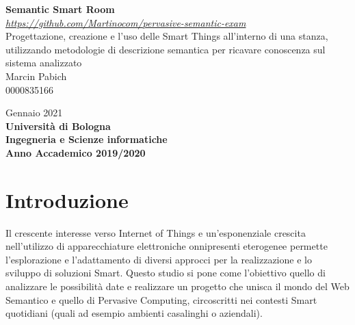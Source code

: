 \documentclass[12pt,a4paper,openright,oneside]{report}
\begin{document}
\begin{titlepage}
	\begin{center}
		
		\vspace*{40mm}
		{\Large{\textbf{Semantic Smart Room}}}\\
		
		\vspace*{4mm}
		{\small{\textit{\url{https://github.com/Martinocom/pervasive-semantic-exam}}}}\\
		
		\vspace*{4mm}
		{\Large{Progettazione, creazione e l'uso delle Smart Things all'interno di una stanza, utilizzando metodologie di descrizione semantica per ricavare conoscenza sul sistema analizzato}}\\
		
		\vspace{10mm}
		{\Large{Marcin Pabich\\}}
		{\large{0000835166}}
		
		\vspace{10mm}
		{\large{Gennaio 2021}}\\
		
		\vspace{20mm}
		{\large{\bf Università di Bologna}}\\
		\vspace{1mm}
		{\large{\bf Ingegneria e Scienze informatiche}}\\
		\vspace{1mm}
		{\large{\bf Anno Accademico 2019/2020}}
		\vspace*{\fill}
	\end{center}
\end{titlepage}
\tableofcontents                        %
\clearpage{\pagestyle{empty}\cleardoublepage}
\listoffigures                          %
\clearpage{\pagestyle{empty}\cleardoublepage}
\lstlistoflistings						%

\clearpage{\pagestyle{empty}\cleardoublepage}
\chapter{Introduzione}
Il crescente interesse verso Internet of Things e un'esponenziale crescita nell'utilizzo di apparecchiature elettroniche onnipresenti eterogenee permette l'esplorazione e l'adattamento di diversi approcci per la realizzazione e lo sviluppo di soluzioni Smart. Questo studio si pone come l'obiettivo quello di analizzare le possibilità date e realizzare un progetto che unisca il mondo del Web Semantico e quello di Pervasive Computing, circoscritti nei contesti Smart quotidiani (quali ad esempio ambienti casalinghi o aziendali).\\
\end{document}
